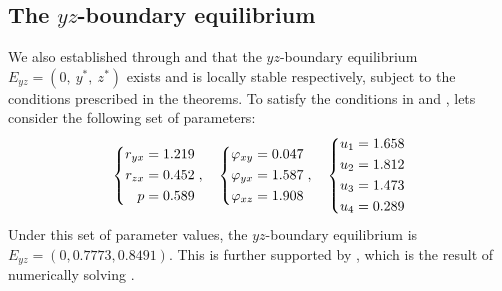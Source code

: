 \subsection{The $yz$-boundary equilibrium}\label{subsec:numsim_yz_boundary_equilibrium}
We also established through  and  that the $yz$-boundary equilibrium $E_{yz}=\left(0,\ y^*,\ z^*\right)$ exists and is locally stable respectively, subject to the conditions prescribed in the theorems.
To satisfy the conditions in  and , lets consider the following set of parameters:
\begin{equation}\label{params:boundary-yz}
    \begin{dcases}
        \begin{aligned}
            r_{yx} &= 1.219\\
            r_{zx} &= 0.452\\
            p &= 0.589
        \end{aligned}
    \end{dcases},\quad 
    \begin{dcases}
        \begin{aligned}
            \varphi_{xy} &= 0.047\\
            \varphi_{yx} &= 1.587\\
            \varphi_{xz} &= 1.908
        \end{aligned}
    \end{dcases},\quad
    \begin{dcases}
        \begin{aligned}
            u_1 &= 1.658\\
            u_2 &= 1.812\\
            u_3 &= 1.473\\
            u_4 &= 0.289
        \end{aligned}
    \end{dcases}
\end{equation}
Under this set of parameter values, the $yz$-boundary equilibrium is $E_{yz}=(0,0.7773,0.8491)$.
This is further supported by , which is the result of numerically solving .
